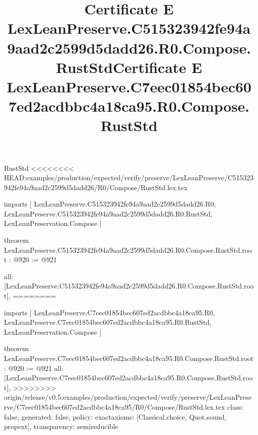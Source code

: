 \begin{lexlean}{RustStd}
<<<<<<<< HEAD:examples/production/expected/verify/preserve/LexLeanPreserve/C515323942fe94a9aad2c2599d5dadd26/R0/Compose/RustStd.lex.tex
\title{Certificate E LexLeanPreserve.C515323942fe94a9aad2c2599d5dadd26.R0.Compose.RustStd}
\begin{coremodule}
imports [
  LexLeanPreserve.C515323942fe94a9aad2c2599d5dadd26.R0,
  LexLeanPreserve.C515323942fe94a9aad2c2599d5dadd26.R0.RustStd,
  LexLeanPreservation.Compose
]

theorem LexLeanPreserve.C515323942fe94a9aad2c2599d5dadd26.R0.Compose.RustStd.root : @920 := @921 {
  all: [LexLeanPreserve.C515323942fe94a9aad2c2599d5dadd26.R0.Compose.RustStd.root],
========
\title{Certificate E LexLeanPreserve.C7eec01854bec607ed2acdbbc4a18ca95.R0.Compose.RustStd}
\begin{coremodule}
imports [
  LexLeanPreserve.C7eec01854bec607ed2acdbbc4a18ca95.R0,
  LexLeanPreserve.C7eec01854bec607ed2acdbbc4a18ca95.R0.RustStd,
  LexLeanPreservation.Compose
]

theorem LexLeanPreserve.C7eec01854bec607ed2acdbbc4a18ca95.R0.Compose.RustStd.root : @920 := @921 {
  all: [LexLeanPreserve.C7eec01854bec607ed2acdbbc4a18ca95.R0.Compose.RustStd.root],
>>>>>>>> origin/release/v0.5:examples/production/expected/verify/preserve/LexLeanPreserve/C7eec01854bec607ed2acdbbc4a18ca95/R0/Compose/RustStd.lex.tex
  class: false,
  generated: false,
  policy: exact{axioms: [Classical.choice, Quot.sound, propext]},
  transparency: semireducible
}


\end{coremodule}}
\end{coremodule}
\end{lexlean}
